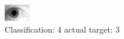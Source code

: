 \begin{figure}[h!]
\begin{center}
\includegraphics[width=0.60\columnwidth]{figures/ID1840_class_4_target_3.png}
\end{center}
\caption{ Classification: 4 actual target: 3}
\label{fig:ID1840_class_4_target_3}
\end{figure}
